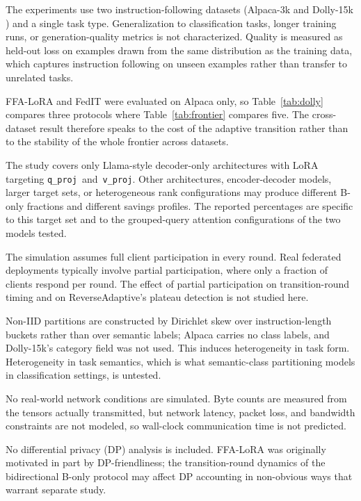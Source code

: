 \documentclass[iicol,pdflatex,sn-mathphys-num]{sn-jnl}
\begin{document}
The experiments use two instruction-following datasets (Alpaca-3k \cite{taori2023alpaca} and Dolly-15k \cite{dolly2023}) and a single task type. Generalization to classification tasks, longer training runs, or generation-quality metrics is not characterized. Quality is measured as held-out loss on examples drawn from the same distribution as the training data, which captures instruction following on unseen examples rather than transfer to unrelated tasks.

FFA-LoRA and FedIT were evaluated on Alpaca only, so Table~\ref{tab:dolly} compares three protocols where Table~\ref{tab:frontier} compares five. The cross-dataset result therefore speaks to the cost of the adaptive transition rather than to the stability of the whole frontier across datasets.

The study covers only Llama-style decoder-only architectures with LoRA targeting \mbox{\texttt{q\_proj} and \texttt{v\_proj}}. Other architectures, encoder-decoder models, larger target sets, or heterogeneous rank configurations may produce different B-only fractions and different savings profiles. The reported percentages are specific to this target set and to the grouped-query attention configurations of the two models tested.

The simulation assumes full client participation in every round. Real federated deployments typically involve partial participation, where only a fraction of clients respond per round. The effect of partial participation on transition-round timing and on ReverseAdaptive's plateau detection is not studied here.

Non-IID partitions are constructed by Dirichlet skew over instruction-length buckets rather than over semantic labels; Alpaca carries no class labels, and Dolly-15k's category field was not used. This induces heterogeneity in task form. Heterogeneity in task semantics, which is what semantic-class partitioning models in classification settings, is untested.

No real-world network conditions are simulated. Byte counts are measured from the tensors actually transmitted, but network latency, packet loss, and bandwidth constraints are not modeled, so wall-clock communication time is not predicted.

No differential privacy (DP) analysis is included. FFA-LoRA \cite{sun2024ffalora} was originally motivated in part by DP-friendliness; the transition-round dynamics of the bidirectional B-only protocol may affect DP accounting in non-obvious ways that warrant separate study.
\end{document}
